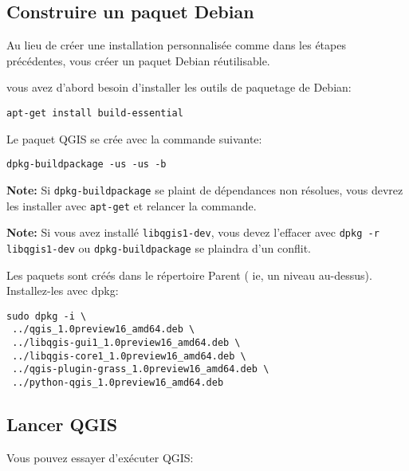 \subsection{Construire un paquet Debian}
Au lieu de créer une installation personnalisée comme dans les étapes précédentes, vous créer un paquet Debian réutilisable.

vous avez d'abord besoin d'installer les outils de paquetage de Debian:

\begin{verbatim}
apt-get install build-essential
\end{verbatim}

Le paquet QGIS se crée avec la commande suivante:

\begin{verbatim}
dpkg-buildpackage -us -us -b
\end{verbatim}

\textbf{Note:} Si \texttt{dpkg-buildpackage} se plaint de dépendances non résolues, vous devrez les installer avec \texttt{apt-get} et relancer la commande.

\textbf{Note:} Si vous avez installé \texttt{libqgis1-dev}, vous devez l'effacer avec \texttt{dpkg -r libqgis1-dev} ou \texttt{dpkg-buildpackage} se plaindra d'un conflit.

Les paquets sont créés dans le répertoire Parent ( ie, un niveau au-dessus).
Installez-les avec dpkg:

\begin{verbatim}
sudo dpkg -i \
 ../qgis_1.0preview16_amd64.deb \
 ../libqgis-gui1_1.0preview16_amd64.deb \
 ../libqgis-core1_1.0preview16_amd64.deb \
 ../qgis-plugin-grass_1.0preview16_amd64.deb \
 ../python-qgis_1.0preview16_amd64.deb
\end{verbatim}

% 
% 

\subsection{Lancer QGIS}
Vous pouvez essayer d'exécuter QGIS:

